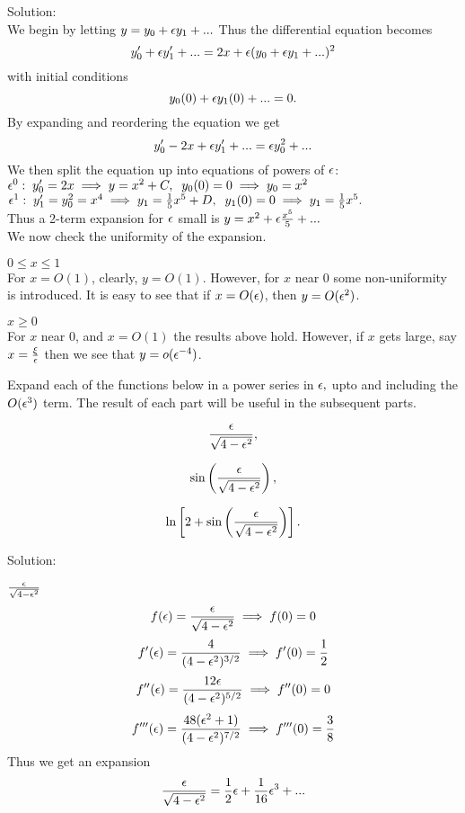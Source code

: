 Solution:\\

    We begin by letting $y=y_0+\epsilon y_1+...$ Thus the differential equation becomes
    $$y_0'+\epsilon y_1'+...=2x+\epsilon(y_0+\epsilon y_1+...)^2$$
    with initial conditions
    $$y_0(0)+\epsilon y_1(0)+...=0.$$
    By expanding and reordering the equation we get
    $$y_0'-2x+\epsilon y_1'+...=\epsilon y_0^2+...$$
    We then split the equation up into equations of powers of $\epsilon$:\\
    $\epsilon^0: \; y_0'=2x\implies y=x^2+C,\;\;y_0(0)=0\implies y_0=x^2$\\
    $\epsilon^1: \; y_1'=y_0^2=x^4\implies y_1=\frac{1}{5}x^5+D,\;\; y_1(0)=0\implies y_1=\frac{1}{5}x^5.$\\
    Thus a 2-term expansion for $\epsilon$ small is $y=x^2+\epsilon\frac{x^5}{5}+...$\\


    We now check the uniformity of the expansion.
    \benum
    \item $0\le x\le 1$\\
    For $x=O(1)$, clearly, $y=O(1)$. However, for $x$ near 0 some non-uniformity is introduced. It is easy to see that if $x=O(\epsilon)$, then $y=O(\epsilon^2)$.
    \item $x\geq 0$\\
    For $x$ near 0, and $x=O(1)$ the results above hold. However, if $x$ gets large, say $x=\frac{\xi}{\epsilon}$ then we see that $y=o(\epsilon^{-4})$.
    \eenum

 \item Expand each of the functions below in a power series in $\epsilon,$ upto and including the $O(\epsilon^3)$ term.
 The result of each part will be useful in the subsequent parts.
 \benum
 \item $$ \frac{\epsilon}{\sqrt{4-\epsilon^2}},$$
 \item $$ \sin \left(\frac{\epsilon}{\sqrt{4-\epsilon^2}}\right),$$
 \item $$\ln \left[2 +  \sin \left(\frac{\epsilon}{\sqrt{4-\epsilon^2}}\right) \right].$$
\eenum

Solution:\\
    \benum
    \item $\frac{\epsilon}{\sqrt{4-\epsilon^2}}$
    $$f(\epsilon)=\frac{\epsilon}{\sqrt{4-\epsilon^2}}\implies f(0)=0$$
    $$f'(\epsilon)=\frac{4}{(4-\epsilon^2)^{3/2}}\implies f'(0)=\frac{1}{2}$$
    $$f''(\epsilon)=\frac{12\epsilon}{(4-\epsilon^2)^{5/2}}\implies f''(0)=0$$
    $$f'''(\epsilon)=\frac{48(\epsilon^2+1)}{(4-\epsilon^2)^{7/2}}\implies f'''(0)=\frac{3}{8}$$
    Thus we get an expansion
    $$\frac{\epsilon}{\sqrt{4-\epsilon^2}}=\frac{1}{2}\epsilon+\frac{1}{16}\epsilon^3+...$$

